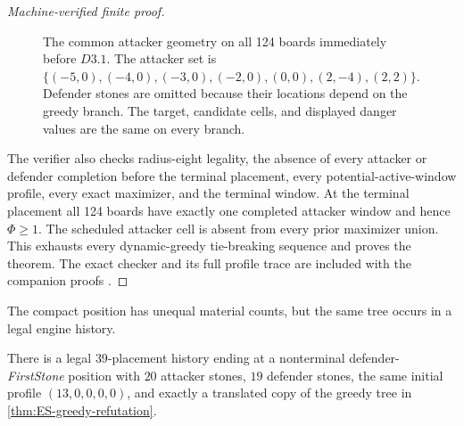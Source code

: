 \begin{proof}[Machine-verified finite proof]
\begin{figure}[tb]
\centering
{}
\caption{The common attacker geometry on all 124 boards immediately before
$D3.1$.  The attacker set is
$\{(-5,0),(-4,0),(-3,0),(-2,0),(0,0),(2,-4),(2,2)\}$.  Defender stones are
omitted because their locations depend on the greedy branch.  The target,
candidate cells, and displayed danger values are the same on every branch.}
\label{fig:greedy-trap}
\end{figure}

The verifier also checks radius-eight legality, the absence of every attacker
or defender completion before the terminal placement, every potential-active-window
profile, every exact maximizer, and the terminal window.  At the terminal
placement all 124 boards have exactly one completed attacker window and hence
$\Phi\geq1$.  The scheduled attacker cell is absent from every prior
maximizer union.  This exhausts every dynamic-greedy tie-breaking sequence and
proves the theorem.  The exact checker and its full profile trace are included
with the companion proofs \cite{hexobot-companions}.
\end{proof}

The compact position has unequal material counts, but the same tree occurs in
a legal engine history.

\begin{proposition}
\label{prop:ES-reachable-greedy}
There is a legal $39$-placement history ending at a nonterminal defender-
\emph{FirstStone} position with $20$ attacker stones, $19$ defender stones,
the same initial profile $(13,0,0,0,0)$, and exactly a translated copy of the
greedy tree in \cref{thm:ES-greedy-refutation}.
\end{proposition}

